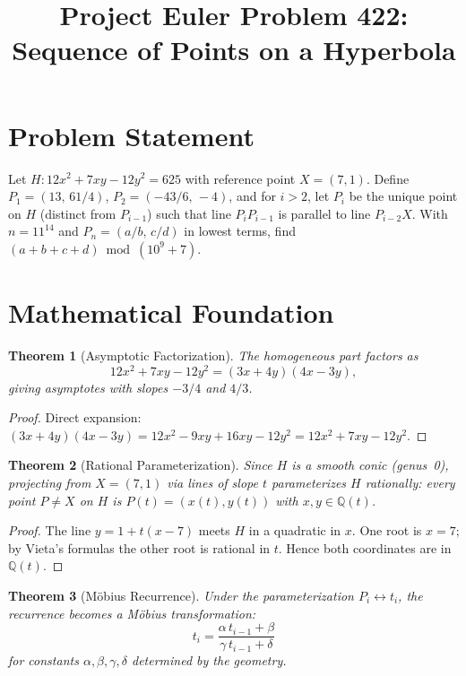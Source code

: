 \documentclass[12pt]{article}
\title{Project Euler Problem 422: Sequence of Points on a Hyperbola}
\author{}
\date{}
\newtheorem{theorem}{Theorem}
\begin{document}
\maketitle

\section{Problem Statement}
Let $H\colon 12x^2 + 7xy - 12y^2 = 625$ with reference point $X=(7,1)$. Define $P_1 = (13,\,61/4)$, $P_2 = (-43/6,\,-4)$, and for $i>2$, let $P_i$ be the unique point on $H$ (distinct from $P_{i-1}$) such that line $P_iP_{i-1}$ is parallel to line $P_{i-2}X$. With $n = 11^{14}$ and $P_n = (a/b,\,c/d)$ in lowest terms, find $(a+b+c+d) \bmod (10^9+7)$.

\section{Mathematical Foundation}

\begin{theorem}[Asymptotic Factorization]
The homogeneous part factors as
\[
12x^2 + 7xy - 12y^2 = (3x+4y)(4x-3y),
\]
giving asymptotes with slopes $-3/4$ and $4/3$.
\end{theorem}

\begin{proof}
Direct expansion: $(3x+4y)(4x-3y) = 12x^2 - 9xy + 16xy - 12y^2 = 12x^2 + 7xy - 12y^2$.
\end{proof}

\begin{theorem}[Rational Parameterization]
Since $H$ is a smooth conic (genus~0), projecting from $X=(7,1)$ via lines of slope $t$ parameterizes $H$ rationally: every point $P \ne X$ on $H$ is $P(t) = (x(t), y(t))$ with $x,y \in \mathbb{Q}(t)$.
\end{theorem}

\begin{proof}
The line $y = 1 + t(x-7)$ meets $H$ in a quadratic in $x$. One root is $x=7$; by Vieta's formulas the other root is rational in $t$. Hence both coordinates are in $\mathbb{Q}(t)$.
\end{proof}

\begin{theorem}[M\"obius Recurrence]
Under the parameterization $P_i \leftrightarrow t_i$, the recurrence becomes a M\"obius transformation:
\[
t_i = \frac{\alpha\, t_{i-1} + \beta}{\gamma\, t_{i-1} + \delta}
\]
for constants $\alpha,\beta,\gamma,\delta$ determined by the geometry.
\end{theorem}
\end{document}
